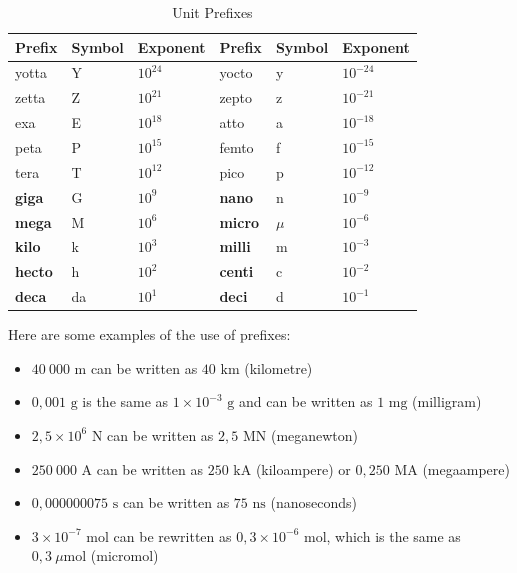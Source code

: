 \begin{table}[H]
        \begin{center}
    \noindent
      \begin{tabular}{|l|l|l|l|l|l|}\hline
\textbf{Prefix} & \textbf{Symbol}  & \textbf{Exponent} & \textbf{Prefix} & \textbf{Symbol} & \textbf{Exponent} \\ \hline
yotta           & Y                & ${10}^{24}$       & yocto           & y               & ${10}^{-24}$      \\ \hline
zetta           &  Z               & ${10}^{21}$       &  zepto          & z               & ${10}^{-21}$      \\ \hline
exa             &  E               & ${10}^{18}$       & atto            & a               & ${10}^{-18}$      \\ \hline
peta            & P                & ${10}^{15}$       & femto           & f               & ${10}^{-15}$      \\ \hline
tera            &  T               & ${10}^{12}$       &  pico           & p               & ${10}^{-12}$      \\ \hline
\textbf{giga}   & G                & ${10}^{9}$        & \textbf{nano}   & n               & ${10}^{-9}$       \\ \hline
\textbf{mega}   &  M               & ${10}^{6}$        & \textbf{micro}  & $\mu $          & ${10}^{-6}$       \\ \hline
\textbf{kilo}   &  k               & ${10}^{3}$        & \textbf{milli}  & m               & ${10}^{-3}$       \\ \hline
\textbf{hecto}  &  h               & ${10}^{2}$        & \textbf{centi}  & c               & ${10}^{-2}$       \\ \hline
\textbf{deca}   &  da              & ${10}^{1}$        & \textbf{deci}   & d               & ${10}^{-1}$       \\ \hline
    \end{tabular}
\caption{Unit Prefixes}
      \end{center}
\label{tab:unitprefixes}
\end{table}
Here are some examples of the use of prefixes:
\begin{itemize}[noitemsep]
  \item $40~000 \text{ m}$ can be written as $40 \text{ km}$ (kilometre)
  \item $0,001 \text{ g}$ is the same as $1 \times{10}^{-3} \text{ g}$ and can be written as $1 \text{ mg}$ (milligram)
  \item $2,5 \times {10}^{6}$ N can be written as $2,5 \text{ MN}$ (meganewton)
  \item $250~000 \text{ A}$ can be written as $250 \text{ kA}$ (kiloampere) or $0,250 \text{ MA}$ (megaampere)
  \item $0,000000075 \text{ s}$ can be written as $75 \text{ ns}$ (nanoseconds)
  \item $3 \times{10}^{-7} \text{ mol}$ can be rewritten as $0,3 \times{10}^{-6} \text{ mol}$, which is the same as $0,3 ~\mu \text{mol}$ (micromol)
\end{itemize}
